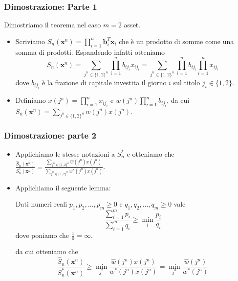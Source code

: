 \documentclass{beamer}
\theoremstyle{plain}
\theoremstyle{definition}
\theoremstyle{remark}
\newcommand{\x}{\bm{x}}
\newcommand{\B}{\bm{b}}
\newcommand{\Sh}{\hat{S}}
\begin{document}
\begin{frame}
	\frametitle{Dimostrazione: Parte 1}
	Dimostriamo il teorema nel caso $m=2$ asset.\newline
	\begin{itemize}
		\item Scriviamo $S_n(\x^n)=\prod_{i = 1}^n{\B_i^T\x_i}$ che è un prodotto di somme come una somma di prodotti. Espandendo infatti otteniamo
		\begin{equation*}
		S_n(\x^n) = \sum_{j^n\in\{1,2\}^n}\prod_{i = 1}^{n}{b_{ij_i}x_{ij_i}} = \sum_{j^n\in\{1,2\}^n}\prod_{i = 1}^{n}{b_{ij_i}}\prod_{i = 1}^n{x_{ij_i}}
		\end{equation*}
		dove $b_{ij_i}$ è la frazione di capitale investita il giorno $i$ sul titolo $j_i\in \{1,2\}$.
		\item Definiamo $x(j^n)=\prod_{i = 1}^n{x_{ij_i}}$ e $w(j^n)\prod_{i = 1}^{n}{b_{ij_i}}$, da cui $S_n(\x^n)=\sum_{j^n\in\{1,2\}^n}{w(j^n)x(j^n)}$.
	\end{itemize}
\end{frame}
\begin{frame}
	\frametitle{Dimostrazione: parte 2}
	\begin{itemize}
		\item Applichiamo le stesse notazioni a $S^*_n$ e otteniamo che $\frac{\Sh_n(\x^n)}{S_n^*(\x^n)} = \frac{\sum_{j^n\in\{1,2\}^n}{\hat{w}(j^n)x(j^n)}}{\sum_{j^n\in\{1,2\}^n}{w^*(j^n)x(j^n)}}$.
		\item Applichiamo il seguente lemma:
		\begin{block}{}
			Dati numeri reali $p_1,p_2,\ldots,p_m\geq 0$ e $q_1,q_2,\ldots,q_m\geq 0$ vale
			\begin{equation*}
			\frac{\sum_{i = 1}^{m}{p_i}}{\sum_{i = 1}^m{q_i}}\geq \min\limits_i\frac{p_i}{q_i}
			\end{equation*}
			dove poniamo che $\frac{x}{0} = \infty$.
		\end{block}
		da cui otteniamo che
		\begin{equation}\label{eq:univfinitedisug}
		\frac{\Sh_n(\x^n)}{S_n^*(\x^n)}\geq \min\limits_{j^n}\frac{\hat{w}(j^n)x(j^n)}{w^*(j^n)x(j^n)}=\min\limits_{j^n}\frac{\hat{w}(j^n)}{w^*(j^n)}
		\end{equation}
	\end{itemize}
\end{frame}
\end{document}
